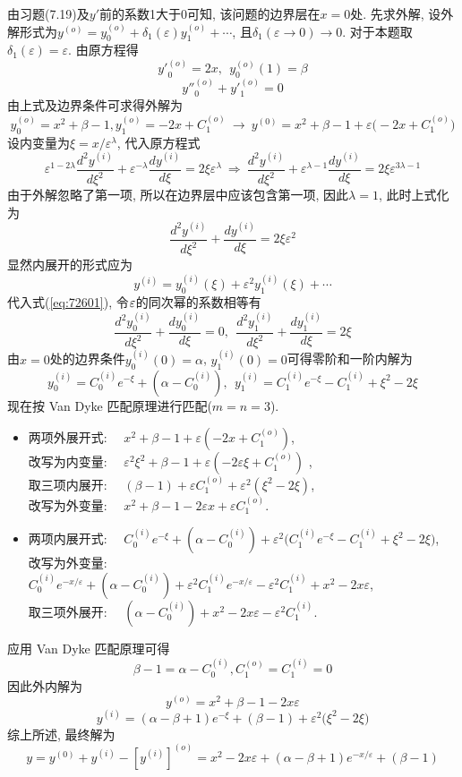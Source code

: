 \begin{solution}
由习题(7.19)及$y'$前的系数1大于0可知, 该问题的边界层在$x=0$处. 先求外解, 设外解形式为$y^{(o)}=y_{0}^{(o)}+\delta_{1}(\varepsilon)y_{1}^{(o)}+\cdots$,
且$\delta_{1}(\varepsilon\rightarrow0)\rightarrow0$. 对于本题取$\delta_{1}(\varepsilon)=\varepsilon$.
由原方程得
\[
{y'}_{0}^{(o)}=2x,~~y_{0}^{(o)}(1)=\beta
\]
\[
{y''}_{0}^{(o)}+{y'}_{1}^{(o)}=0
\]
由上式及边界条件可求得外解为
\[
y_{0}^{(o)}=x^{2}+\beta-1,y_{1}^{(o)}=-2x+C_{1}^{(o)}
~\rightarrow~
y^{(0)}=x^{2}+\beta-1+\varepsilon\big(-2x+C_{1}^{(o)}\big)
\]
设内变量为$\xi=x/\varepsilon^{\lambda}$, 代入原方程式
\[
\varepsilon^{1-2\lambda}\frac{d^{2}y^{(i)}}{d\xi^{2}}+\varepsilon^{-\lambda}\frac{dy^{(i)}}{d\xi}=2\xi\varepsilon^{\lambda}
~\Rightarrow~
\frac{d^{2}y^{(i)}}{d\xi^{2}}+\varepsilon^{\lambda-1}\frac{dy^{(i)}}{d\xi}=2\xi\varepsilon^{3\lambda-1}
\]
由于外解忽略了第一项, 所以在边界层中应该包含第一项, 因此$\lambda=1$, 此时上式化为
\begin{equation}
\frac{d^{2}y^{(i)}}{d\xi^{2}}+\frac{dy^{(i)}}{d\xi}=2\xi\varepsilon^{2}\label{eq:72601}
\end{equation}
显然内展开的形式应为
\[
y^{(i)}=y_{0}^{(i)}(\xi)+\varepsilon^{2}y_{1}^{(i)}(\xi)+\cdots
\]
代入式(\ref{eq:72601}), 令$\text{\ensuremath{\varepsilon}}$的同次幂的系数相等有
\[
\frac{d^{2}y_{0}^{(i)}}{d\xi^{2}}+\frac{dy_{0}^{(i)}}{d\xi}=0, ~~ \frac{d^{2}y_{1}^{(i)}}{d\xi^{2}}+\frac{dy_{1}^{(i)}}{d\xi}=2\xi
\]
由$x=0$处的边界条件$y_{0}^{(i)}(0)=\alpha$, $y_{1}^{(i)}(0)=0$可得零阶和一阶内解为
\[
y_{0}^{(i)}=C_{0}^{(i)}e^{-\xi}+(\alpha-C_{0}^{(i)}), ~~ y_{1}^{(i)}=C_{1}^{(i)}e^{-\xi}-C_{1}^{(i)}+\xi^{2}-2\xi
\]
现在按 Van Dyke 匹配原理进行匹配($m=n=3$).
\begin{itemize}
\item 两项外展开式: \ \  $x^{2}+\beta-1+\varepsilon(-2x+C_{1}^{(o)})$,
\\改写为内变量: \ \  $\varepsilon^{2}\xi^{2} + \beta-1 + \varepsilon (-2\varepsilon\xi+C_{1}^{(o)})$ ,\\
取三项内展开: \ \  $(\beta-1) + \varepsilon C_{1}^{(o)} + \varepsilon^{2}(\xi^{2}-2\xi)$, \\
改写为外变量: \ \  $x^{2}+\beta-1-2\varepsilon x+\varepsilon C_{1}^{(o)}$.
\item 两项内展开式: \ \  $C_{0}^{(i)}e^{-\xi} + (\alpha-C_{0}^{(i)}) + \varepsilon^{2}\big(C_{1}^{(i)}e^{-\xi} - C_{1}^{(i)} + \xi^{2} - 2\xi\big)$,\\
改写为外变量: \ \  $C_{0}^{(i)}e^{-x/\varepsilon} + (\alpha-C_{0}^{(i)}) + \varepsilon^{2}C_{1}^{(i)}e^{-x/\varepsilon} - \varepsilon^{2}C_{1}^{(i)} + x^{2} - 2x\varepsilon$,\\
取三项外展开: \ \  $(\alpha - C_{0}^{(i)}) + x^{2} - 2x\varepsilon - \varepsilon^{2}C_{1}^{(i)}$.
\end{itemize}
应用 Van Dyke 匹配原理可得
\[
\beta-1=\alpha-C_{0}^{(i)},C_{1}^{(o)}=C_{1}^{(i)}=0
\]
因此外内解为
\[
y^{(o)}=x^{2}+\beta-1-2x\varepsilon
\]
\[
y^{(i)}=(\alpha-\beta+1)e^{-\xi}+(\beta-1)+\varepsilon^{2}\big(\xi^{2}-2\xi\big)
\]
综上所述, 最终解为
\[
y=y^{(0)}+y^{(i)}-[y^{(i)}]^{(o)}=x^{2}-2x\varepsilon+(\alpha-\beta+1)e^{-x/\varepsilon}+(\beta-1)
\]


\end{solution}
